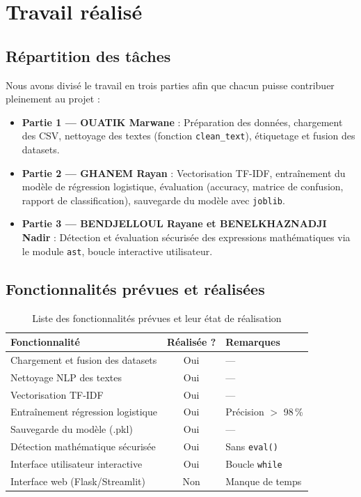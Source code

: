 \documentclass[a4paper, 12pt, twoside]{article}
\begin{document}
\section{Travail réalisé}

\subsection*{Répartition des tâches}

Nous avons divisé le travail en trois parties afin que chacun puisse
contribuer pleinement au projet :

\begin{itemize}
  \item \textbf{Partie 1 --- OUATIK Marwane} : Préparation des données,
        chargement des CSV, nettoyage des textes (fonction
        \texttt{clean\_text}), étiquetage et fusion des datasets.
  \item \textbf{Partie 2 --- GHANEM Rayan} : Vectorisation TF-IDF,
        entraînement du modèle de régression logistique, évaluation
        (accuracy, matrice de confusion, rapport de classification),
        sauvegarde du modèle avec \texttt{joblib}.
  \item \textbf{Partie 3 --- BENDJELLOUL Rayane et BENELKHAZNADJI Nadir} :
        Détection et évaluation sécurisée des expressions mathématiques
        via le module \texttt{ast}, boucle interactive utilisateur.
\end{itemize}

\subsection*{Fonctionnalités prévues et réalisées}

\begin{table}[h]
\begin{center}
\begin{tabular}{|p{7cm}|c|p{4cm}|}
\hline
\textbf{Fonctionnalité} & \textbf{Réalisée ?} & \textbf{Remarques} \\
\hline
Chargement et fusion des datasets & Oui & --- \\
\hline
Nettoyage NLP des textes & Oui & --- \\
\hline
Vectorisation TF-IDF & Oui & --- \\
\hline
Entraînement régression logistique & Oui & Précision $>$ 98\,\% \\
\hline
Sauvegarde du modèle (.pkl) & Oui & --- \\
\hline
Détection mathématique sécurisée & Oui & Sans \texttt{eval()} \\
\hline
Interface utilisateur interactive & Oui & Boucle \texttt{while} \\
\hline
Interface web (Flask/Streamlit) & Non & Manque de temps \\
\hline
\end{tabular}
\end{center}
\caption{Liste des fonctionnalités prévues et leur état de réalisation}
\label{tab:fonctionnalites}
\end{table}
\end{document}
